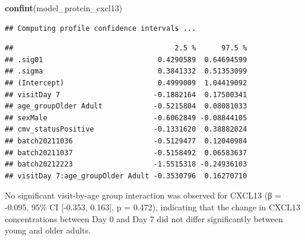 \documentclass[
]{article}
\newenvironment{Shaded}{\begin{snugshade}}{\end{snugshade}}
\newcommand{\FunctionTok}[1]{\textcolor[rgb]{0.13,0.29,0.53}{\textbf{#1}}}
\newcommand{\NormalTok}[1]{#1}
\begin{document}
\begin{Shaded}
\begin{Highlighting}[]
\FunctionTok{confint}\NormalTok{(model\_protein\_cxcl13)}
\end{Highlighting}
\end{Shaded}

\begin{verbatim}
## Computing profile confidence intervals ...
\end{verbatim}

\begin{verbatim}
##                                      2.5 %      97.5 %
## .sig01                           0.4290589  0.64694599
## .sigma                           0.3841332  0.51353099
## (Intercept)                      0.4999009  1.04419092
## visitDay 7                      -0.1882164  0.17500341
## age_groupOlder Adult            -0.5215804  0.08081033
## sexMale                         -0.6062849 -0.08844105
## cmv_statusPositive              -0.1331620  0.38882024
## batch20211036                   -0.5129477  0.12040984
## batch20211037                   -0.5158492  0.06583637
## batch20212223                   -1.5515318 -0.24936103
## visitDay 7:age_groupOlder Adult -0.3530796  0.16270710
\end{verbatim}

No significant visit-by-age group interaction was observed for CXCL13 (β
= -0.095, 95\% CI {[}-0.353, 0.163{]}, p = 0.472), indicating that the
change in CXCL13 concentrations between Day 0 and Day 7 did not differ
significantly between young and older adults.
\end{document}
